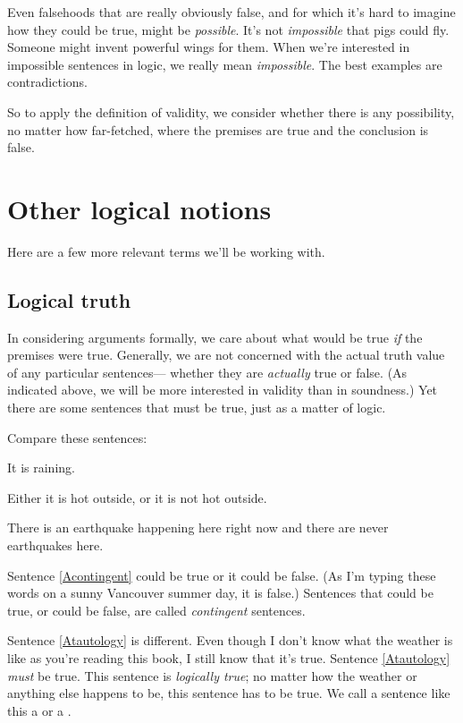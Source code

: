 Even falsehoods that are really obviously false, and for which it's hard to imagine how they could be true, might be \emph{possible}. It's not \emph{impossible} that pigs could fly. Someone might invent powerful wings for them. When we're interested in impossible sentences in logic, we really mean \emph{impossible}. The best examples are contradictions.

So to apply the definition of validity, we consider whether there is any possibility, no matter how far-fetched, where the premises are true and the conclusion is false.

\section{Other logical notions}

Here are a few more relevant terms we'll be working with.

\subsection{Logical truth}
\label{sec-tautologydef}
In considering arguments formally, we care about what would be true \emph{if} the premises were true. Generally, we are not concerned with the actual truth value of any particular sentences--- whether they are \emph{actually} true or false. (As indicated above, we will be more interested in validity than in soundness.) Yet there are some sentences that must be true, just as a matter of logic.

Compare these sentences:
\begin{earg}
\item[\ex{Acontingent}] It is raining.
\item[\ex{Atautology}] Either it is hot outside, or it is not hot outside.
\item[\ex{Acontradiction}] There is an earthquake happening here right now and there are never earthquakes here.
\end{earg}
Sentence \ref{Acontingent} could be true or it could be false. (As I'm typing these words on a sunny Vancouver summer day, it is false.) Sentences that could be true, or could be false, are called \emph{contingent} sentences.

Sentence \ref{Atautology} is different. Even though I don't know what the weather is like as you're reading this book, I still know that it's true. Sentence \ref{Atautology} \emph{must} be true. This sentence is \emph{logically true}; no matter how the weather or anything else happens to be, this sentence has to be true. We call a sentence like this a  or a .

